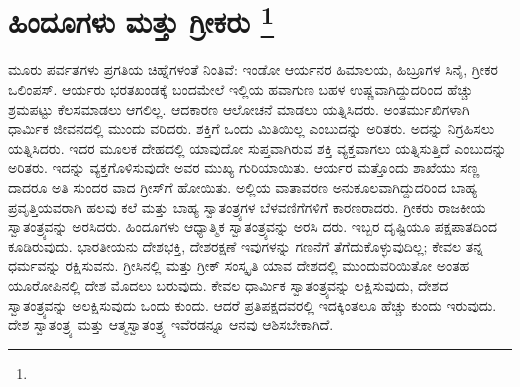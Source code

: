 
\chapter[ಹಿಂದೂಗಳು ಮತ್ತು ಗ್ರೀಕರು ]{ಹಿಂದೂಗಳು ಮತ್ತು ಗ್ರೀಕರು \protect\footnote{}}

ಮೂರು ಪರ್ವತಗಳು ಪ್ರಗತಿಯ ಚಿಹ್ನೆಗಳಂತೆ ನಿಂತಿವೆ: ಇಂಡೋ ಆರ್ಯನರ ಹಿಮಾಲಯ, ಹಿಬ್ರೂಗಳ ಸಿನೈ, ಗ್ರೀಕರ ಒಲಿಂಪಸ್​. ಆರ್ಯರು ಭರತಖಂಡಕ್ಕೆ ಬಂದಮೇಲೆ ಇಲ್ಲಿಯ ಹವಾಗುಣ ಬಹಳ ಉಷ್ಣವಾಗಿದ್ದುದರಿಂದ ಹೆಚ್ಚು ಶ್ರಮಪಟ್ಟು ಕೆಲಸಮಾಡಲು ಆಗಲಿಲ್ಲ. ಆದಕಾರಣ ಆಲೋಚನೆ ಮಾಡಲು ಯತ್ನಿಸಿದರು. ಅಂತರ್ಮುಖಿಗಳಾಗಿ ಧಾರ್ಮಿಕ ಜೀವನದಲ್ಲಿ ಮುಂದು ವರಿದರು. ಶಕ್ತಿಗೆ ಒಂದು ಮಿತಿಯಿಲ್ಲ ಎಂಬುದನ್ನು ಅರಿತರು. ಅದನ್ನು ನಿಗ್ರಹಿಸಲು ಯತ್ನಿಸಿದರು. ಇದರ ಮೂಲಕ ದೇಹದಲ್ಲಿ ಯಾವುದೋ ಸುಪ್ತವಾಗಿರುವ ಶಕ್ತಿ ವ್ಯಕ್ತವಾಗಲು ಯತ್ನಿಸುತ್ತಿದೆ ಎಂಬುದನ್ನು ಅರಿತರು. ಇದನ್ನು ವ್ಯಕ್ತಗೊಳಿಸುವುದೇ ಅವರ ಮುಖ್ಯ ಗುರಿಯಾಯಿತು. ಆರ್ಯರ ಮತ್ತೊಂದು ಶಾಖೆಯು ಸಣ್ಣ ದಾದರೂ ಅತಿ ಸುಂದರ ವಾದ ಗ್ರೀಸ್​ಗೆ ಹೋಯಿತು. ಅಲ್ಲಿಯ ವಾತಾವರಣ ಅನುಕೂಲವಾಗಿದ್ದುದರಿಂದ ಬಾಹ್ಯ ಪ್ರವೃತ್ತಿಯವರಾಗಿ ಹಲವು ಕಲೆ ಮತ್ತು ಬಾಹ್ಯ ಸ್ವಾತಂತ್ರ್ಯಗಳ ಬೆಳವಣಿಗೆಗಳಿಗೆ ಕಾರಣರಾದರು. ಗ್ರೀಕರು ರಾಜಕೀಯ ಸ್ವಾತಂತ್ರ್ಯವನ್ನು ಅರಸಿದರು. ಹಿಂದೂಗಳು ಆಧ್ಯಾತ್ಮಿಕ ಸ್ವಾತಂತ್ರ್ಯವನ್ನು ಅರಸಿ ದರು. ಇಬ್ಬರ ದೃಷ್ಟಿಯೂ ಪಕ್ಷಪಾತದಿಂದ ಕೂಡಿರುವುದು. ಭಾರತೀಯನು ದೇಶಭಕ್ತಿ, ದೇಶರಕ್ಷಣೆ ಇವುಗಳನ್ನು ಗಣನೆಗೆ ತೆಗೆದುಕೊಳ್ಳುವುದಿಲ್ಲ; ಕೇವಲ ತನ್ನ ಧರ್ಮವನ್ನು ರಕ್ಷಿಸುವನು. ಗ್ರೀಸಿನಲ್ಲಿ ಮತ್ತು ಗ್ರೀಕ್​ ಸಂಸ್ಕೃತಿ ಯಾವ ದೇಶದಲ್ಲಿ ಮುಂದುವರಿಯಿತೋ ಅಂತಹ ಯೂರೋಪಿನಲ್ಲಿ ದೇಶ ಮೊದಲು ಬರುವುದು. ಕೇವಲ ಧಾರ್ಮಿಕ ಸ್ವಾತಂತ್ರ್ಯವನ್ನು ಲಕ್ಷಿಸುವುದು, ದೇಶದ ಸ್ವಾತಂತ್ರ್ಯವನ್ನು ಅಲಕ್ಷಿಸುವುದು ಒಂದು ಕುಂದು. ಆದರೆ ಪ್ರತಿಪಕ್ಷದವರಲ್ಲಿ ಇದಕ್ಕಿಂತಲೂ ಹೆಚ್ಚು ಕುಂದು ಇರುವುದು. ದೇಶ ಸ್ವಾತಂತ್ರ್ಯ ಮತ್ತು ಆತ್ಮಸ್ವಾತಂತ್ರ್ಯ ಇವೆರಡನ್ನೂ ಆನವು ಆಶಿಸಬೇಕಾಗಿದೆ.


